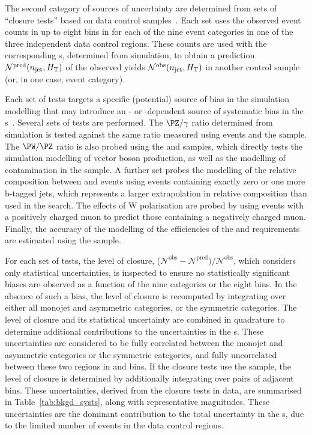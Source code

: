 The second category of sources of uncertainty are determined from sets
of ``closure tests'' based on data control
samples~\cite{RA1Paper2012}. Each set uses the observed event counts
in up to eight bins in \scalht for each of the nine \njet event
categories in one of the three independent data control regions. These
counts are used with the corresponding {\tf}s, determined from
simulation, to obtain a prediction $\mathcal{N}^\text{pred}(n_{\text{jet}},
H_{\mathrm{T}})$ of the observed yields $\mathcal{N}^\text{obs}(n_{\text{jet}},
H_{\mathrm{T}})$ in another control sample (or, in one case, \nb event
category).

Each set of tests targets a specific (potential) source of bias in the
simulation modelling that may introduce an \njet- or \scalht-dependent
source of systematic bias in the {\tf}s~\cite{RA1Paper2012}. Several
sets of tests are performed. The $\PZ/\gamma$ ratio determined from
simulation is tested against the same ratio measured using \zmumuj
events and the \gj sample.
The $\PW/\PZ$ ratio is also probed using the \mj and \mmj
samples, which directly tests the simulation modelling of vector
boson production, as well as the modelling of \ttbar contamination in
the \mj sample. 
A further set probes the modelling of the relative composition between
\wlj and \ttbar events using \mj events containing exactly zero or one
more b-tagged jets, which represents a larger extrapolation in
relative composition than used in the search.  The effects of W
polarisation are probed by using \mj events with a positively charged
muon to predict those containing a negatively charged muon. Finally,
the accuracy of the modelling of the efficiencies of the \alphat and
\bdphi requirements are estimated using the \mj sample.

For each set of tests, the level of closure, %
($\mathcal{N}^\text{obs} - \mathcal{N}^\text{pred}) /
\mathcal{N}^\text{obs}$, which considers only statistical
uncertainties, is inspected to ensure no statistically significant
biases are observed as a function of the nine \njet categories or the
eight \scalht bins. In the absence of such a bias, the level of
closure is recomputed by integrating over either all monojet and
asymmetric \njet categories, or the symmetric \njet categories. The
level of closure and its statistical uncertainty are combined in
quadrature to determine additional contributions to the uncertainties
in the {\tf}s. These uncertainties are considered to be
fully correlated between the monojet and asymmetric \njet categories
or the symmetric \njet categories, and fully uncorrelated between
these two regions in \njet and \scalht bins. If the closure tests use
the \mmj sample, the level of closure is determined by additionally
integrating over pairs of adjacent \scalht bins. These uncertainties,
derived from the closure tests in data, are summarised in
Table~\ref{tab:bkgd_systs}, along with representative
magnitudes. These uncertainties are the dominant contribution to the
total uncertainty in the {\tf}s, due to the limited number
of events in the data control regions.

